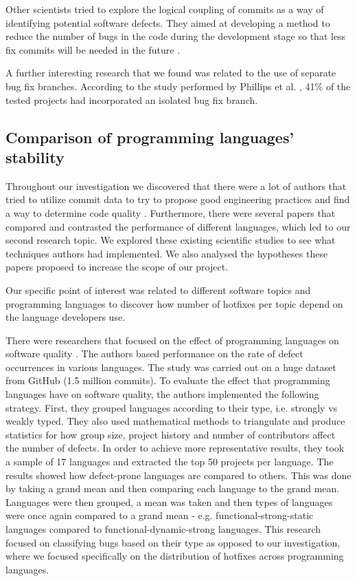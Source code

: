 Other scientists tried to explore the logical coupling of commits as a way of identifying potential software defects. They aimed at developing a method to reduce the number of bugs in the code during the development stage so that less fix commits will be needed in the future \cite{Steff2012}.\par

A further interesting research that we found was related to the use of separate bug fix branches. According to the study performed by Phillips et al. \cite{Phillips2011}, 41\% of the tested projects had incorporated an isolated bug fix branch.

\subsection{Comparison of programming languages' stability}
Throughout our investigation we discovered that there were a lot of authors that tried to utilize commit data to try to propose good engineering practices and find a way to determine code quality \cite{Agrawal2015}. Furthermore, there were several papers that compared and contrasted the performance of different languages, which led to our second research topic. We explored these existing scientific studies to see what techniques authors had implemented. We also analysed the hypotheses these papers proposed to increase the scope of our project.\par

Our specific point of interest was related to different software topics and programming languages to discover how number of hotfixes per topic depend on the language developers use.\par

There were researchers that focused on the effect of programming languages on software quality \cite{Ray2014}. The authors based performance on the rate of defect occurrences in various languages. The study was carried out on a huge dataset from GitHub (1.5 million commits). To evaluate the effect that programming languages have on software quality, the authors implemented the following strategy. First, they grouped languages according to their type, i.e. strongly vs weakly typed. They also used mathematical methods to triangulate and produce statistics for how group size, project history and number of contributors affect the number of defects. In order to achieve more representative results, they took a sample of 17 languages and extracted the top 50 projects per language. The results showed how defect-prone languages are compared to others. This was done by taking a grand mean and then comparing each language to the grand mean. Languages were then grouped, a mean was taken and then types of languages were once again compared to a grand mean - e.g. functional-strong-static languages compared to functional-dynamic-strong languages. This research focused on classifying bugs based on their type as opposed to our investigation, where we focused specifically on the distribution of hotfixes across programming languages.\par

